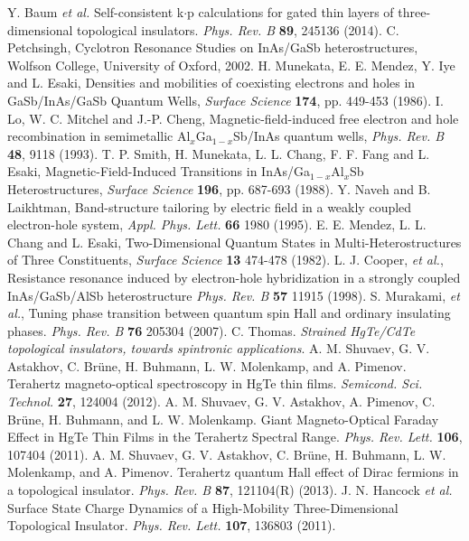 \documentclass[titlepage,a4paper]{book}
\begin{document}
\begin{thebibliography}{199}
Y. Baum \textit{et al.} Self-consistent k$\cdot$p calculations for gated thin layers of three-dimensional topological insulators. \textit{Phys. Rev. B} \textbf{89}, 245136 (2014).
C. Petchsingh, Cyclotron Resonance Studies on InAs/GaSb heterostructures, Wolfson College, University of Oxford, 2002.
H. Munekata, E. E. Mendez, Y. Iye and L. Esaki, Densities and mobilities of coexisting electrons and holes in GaSb/InAs/GaSb Quantum Wells, \textit{Surface Science} \textbf{174}, pp. 449-453 (1986).
I. Lo, W. C. Mitchel and J.-P. Cheng, Magnetic-field-induced free electron and hole recombination in semimetallic Al$_x$Ga$_{1-x}$Sb/InAs quantum wells, \textit{Phys. Rev. B} \textbf{48}, 9118 (1993).
T. P. Smith, H. Munekata, L. L. Chang, F. F. Fang and L. Esaki, Magnetic-Field-Induced Transitions in InAs/Ga$_{1-x}$Al$_x$Sb Heterostructures, \textit{Surface Science} \textbf{196}, pp. 687-693 (1988).
Y. Naveh and B. Laikhtman, Band-structure tailoring by electric field in a weakly coupled electron-hole system, \textit{Appl. Phys. Lett.} \textbf{66} 1980 (1995).
E. E. Mendez, L. L. Chang and L. Esaki, Two-Dimensional Quantum States in Multi-Heterostructures of Three Constituents, \textit{Surface Science} \textbf{13} 474-478 (1982).
L. J. Cooper, \textit{et al.}, Resistance resonance induced by electron-hole hybridization in a strongly coupled InAs/GaSb/AlSb heterostructure \textit{Phys. Rev. B} \textbf{57} 11915 (1998).
S. Murakami, \textit{et al.}, Tuning phase transition between quantum spin Hall and ordinary insulating phases. \textit{Phys. Rev. B} \textbf{76} 205304 (2007).
C. Thomas. \textit{Strained HgTe/CdTe topological insulators, towards spintronic applications}.  
A. M. Shuvaev, G. V. Astakhov, C. Brüne, H. Buhmann, L. W. Molenkamp, and A. Pimenov. Terahertz magneto-optical spectroscopy in HgTe thin films. \textit{Semicond. Sci. Technol.} \textbf{27}, 124004 (2012).
A. M. Shuvaev, G. V. Astakhov, A. Pimenov, C. Brüne, H. Buhmann, and L. W. Molenkamp. Giant Magneto-Optical Faraday Effect in HgTe Thin Films in the Terahertz Spectral Range. \textit{Phys. Rev. Lett.} \textbf{106}, 107404 (2011).
A. M. Shuvaev, G. V. Astakhov, C. Brüne, H. Buhmann, L. W. Molenkamp, and A. Pimenov. Terahertz quantum Hall effect of Dirac fermions in a topological insulator. \textit{Phys. Rev. B} \textbf{87}, 121104(R) (2013).
J. N. Hancock \textit{et al.} Surface State Charge Dynamics of a High-Mobility Three-Dimensional Topological Insulator. \textit{Phys. Rev. Lett.} \textbf{107}, 136803 (2011).

\end{thebibliography}
\end{document}
